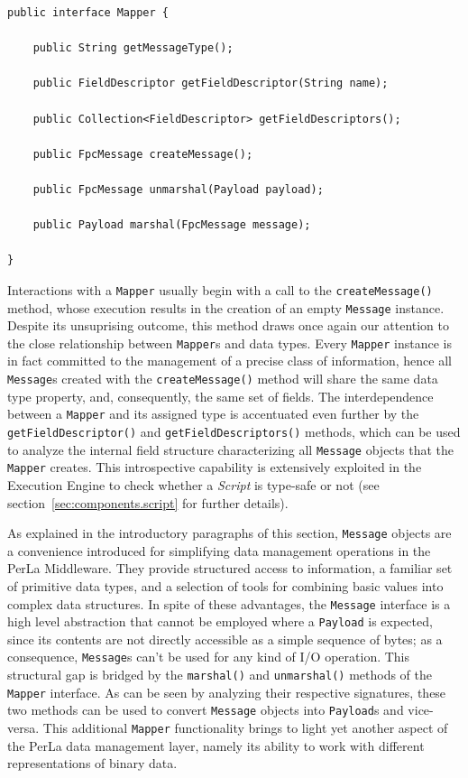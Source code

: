 \lstset{language=Java}
\begin{lstlisting}[float,floatplacement=!hbt,caption=The Mapper
interface,label={lst:mapper}]
public interface Mapper {

    public String getMessageType();

    public FieldDescriptor getFieldDescriptor(String name);

    public Collection<FieldDescriptor> getFieldDescriptors();

    public FpcMessage createMessage();

    public FpcMessage unmarshal(Payload payload);

    public Payload marshal(FpcMessage message);

}
\end{lstlisting}

Interactions with a \texttt{Mapper} usually begin with a call to the
\texttt{createMessage()} method, whose execution results in the creation of an
empty \texttt{Message} instance. Despite its unsuprising outcome, this method
draws once again our attention to the close relationship between
\texttt{Mapper}s and data types. Every \texttt{Mapper} instance is in fact
committed to the management of a precise class of information, hence all
\texttt{Message}s created with the \texttt{createMessage()} method will share
the same data type property, and, consequently, the same set of fields. The
interdependence between a \texttt{Mapper} and its assigned type is accentuated
even further by the \texttt{getFieldDescriptor()} and
\texttt{getFieldDescriptors()} methods, which can be used to analyze the
internal field structure characterizing all \texttt{Message} objects that the
\texttt{Mapper} creates. This introspective capability is extensively exploited
in the Execution Engine to check whether a \textit{Script} is type-safe or not
(see section~\ref{sec:components.script} for further details).

As explained in the introductory paragraphs of this section, \texttt{Message}
objects are a convenience introduced for simplifying data management operations
in the PerLa Middleware. They provide structured access to information, a
familiar set of primitive data types, and a selection of tools for combining
basic values into complex data structures. In spite of these advantages, the
\texttt{Message} interface is a high level abstraction that cannot be employed
where a \texttt{Payload} is expected, since its contents are not directly
accessible as a simple sequence of bytes; as a consequence, \texttt{Message}s
can't be used for any kind of I/O operation. This structural gap is bridged by
the \texttt{marshal()} and \texttt{unmarshal()} methods of the \texttt{Mapper}
interface. As can be seen by analyzing their respective signatures, these two
methods can be used to convert \texttt{Message} objects into \texttt{Payload}s
and vice-versa. This additional \texttt{Mapper} functionality brings to light
yet another aspect of the PerLa data management layer, namely its ability to
work with different representations of binary data.

